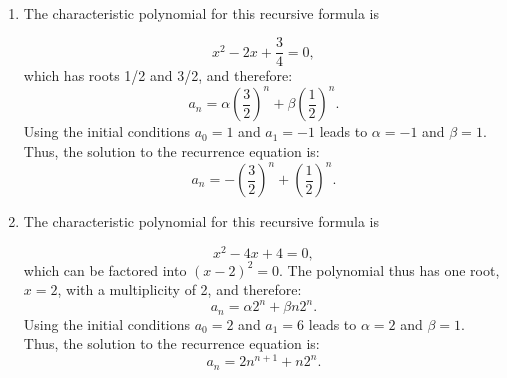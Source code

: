 \begin{problem}{1} $ $

	\begin{enumerate}
		\item The characteristic polynomial for this recursive formula is
		
		\begin{equation*}
		x^2-2x+\frac{3}{4}=0,
		\end{equation*}
		which has roots 1/2 and 3/2, and therefore:		
		\begin{equation*}
		a_n=\alpha \left(\frac{3}{2} \right)^n+\beta \left(\frac{1}{2} \right)^n.
		\end{equation*}
		Using the initial conditions $a_0=1$ and $a_1=-1$ leads to $\alpha=-1$ and $\beta=1$.  Thus, the solution to the recurrence equation is:
		\begin{equation*}
		a_n=-\left(\frac{3}{2} \right)^n+ \left(\frac{1}{2} \right)^n.
		\end{equation*}
		
		\item  The characteristic polynomial for this recursive formula is
		
		\begin{equation*}
		x^2-4x+4=0,
		\end{equation*}
		which can be factored into $(x-2)^2=0$.  The polynomial thus has one root, $x=2$, with a multiplicity of 2, and therefore:
		\begin{equation*}
		a_n=\alpha 2^n+\beta n 2^n.
		\end{equation*}
		Using the initial conditions $a_0=2$ and $a_1=6$ leads to $\alpha=2$ and $\beta=1$.  Thus, the solution to the recurrence equation is:
		\begin{equation*}
		a_n=2n^{n+1}+n2^n.
		\end{equation*}

	\end{enumerate}

\end{problem}


